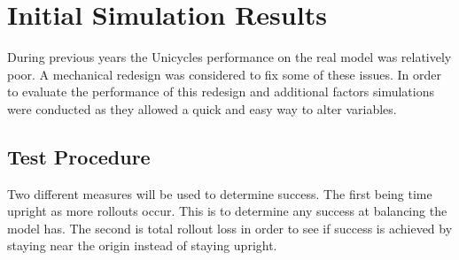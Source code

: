 \documentclass[twoside,twocolumn,12pt]{article}
\begin{document}
\clearpage
\section{Initial Simulation Results}

During previous years the Unicycles performance on the real model was relatively poor. A mechanical redesign was considered to fix some of these issues. In order to evaluate the performance of this redesign and additional factors simulations were conducted as they allowed a quick and easy way to alter variables.
\newline

\subsection{Test Procedure}

Two different measures will be used to determine success. The first being time upright as more rollouts occur. This is to determine any success at balancing the model has. The second is total rollout loss in order to see if success is achieved by staying near the origin instead of staying upright.
\end{document}
